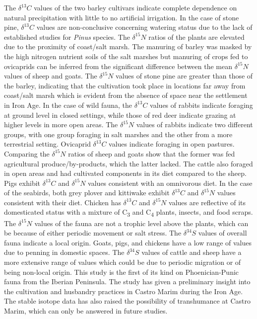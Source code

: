 \documentclass[review]{elsarticle} %
\begin{document}
The \(\delta ^{13}C\) values of the two barley cultivars indicate complete dependence on natural precipitation with little to no artificial irrigation. In the case of stone pine, \(\delta ^{13}C\) values are non-conclusive concerning watering status due to the lack of established studies for \emph{Pinus} species. The \(\delta ^{15}N\) ratios of the plants are elevated due to the proximity of coast/salt marsh. The manuring of barley was masked by the high nitrogen nutrient soils of the salt marshes but manuring of crops fed to ovicaprids can be inferred from the significant difference between the mean \(\delta ^{15}N\) values of sheep and goats. The \(\delta ^{15}N\) values of stone pine are greater than those of the barley, indicating that the cultivation took place in locations far away from coast/salt marsh which is evident from the absence of space near the settlement in Iron Age. In the case of wild fauna, the \(\delta ^{13}C\) values of rabbits indicate foraging at ground level in closed settings, while those of red deer indicate grazing at higher levels in more open areas. The \(\delta ^{15}N\) values of rabbits indicate two different groups, with one group foraging in salt marshes and the other from a more terrestrial setting. Ovicaprid \(\delta ^{13}C\) values indicate foraging in open pastures. Comparing the \(\delta ^{15}N\) ratios of sheep and goats show that the former was fed agricultural produce/by-products, which the latter lacked. The cattle also foraged in open areas and had cultivated components in its diet compared to the sheep. Pigs exhibit \(\delta ^{13}C\) and \(\delta ^{15}N\) values consistent with an omnivorous diet. In the case of the seabirds, both grey plover and kittiwake exhibit \(\delta ^{13}C\) and \(\delta ^{15}N\) values consistent with their diet. Chicken has \(\delta ^{13}C\) and \(\delta ^{15}N\) values are reflective of its domesticated status with a mixture of C\textsubscript{3} and C\textsubscript{4} plants, insects, and food scraps. The \(\delta ^{15}N\) values of the fauna are not a trophic level above the plants, which can be because of either periodic movement or salt stress.
The \(\delta ^{34}S\) values of overall fauna indicate a local origin. Goats, pigs, and chickens have a low range of values due to penning in domestic spaces. The \(\delta ^{34}S\) values of cattle and sheep have a more extensive range of values which could be due to periodic migration or of being non-local origin.
This study is the first of its kind on Phoenician-Punic fauna from the Iberian Peninsula. The study has given a preliminary insight into the cultivation and husbandry practices in Castro Marim during the Iron Age. The stable isotope data has also raised the possibility of transhumance at Castro Marim, which can only be answered in future studies.
\end{document}
